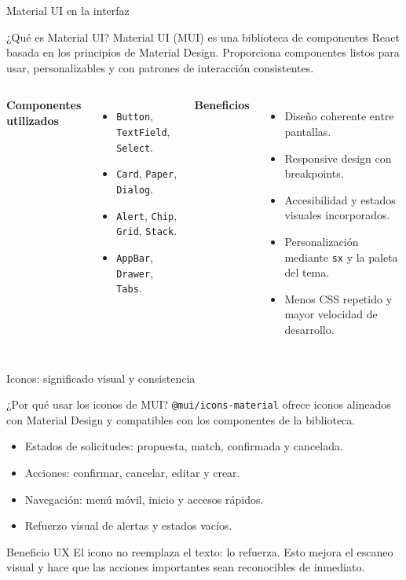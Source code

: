\documentclass[aspectratio=169,11pt]{beamer}
\begin{document}
\begin{frame}{Material UI en la interfaz}
  \begin{block}{¿Qué es Material UI?}
    Material UI (MUI) es una biblioteca de componentes React basada en los
    principios de Material Design. Proporciona componentes listos para usar,
    personalizables y con patrones de interacción consistentes.
  \end{block}
  \begin{columns}[T]
      \textbf{Componentes utilizados}
      \begin{itemize}
        \item \texttt{Button}, \texttt{TextField}, \texttt{Select}.
        \item \texttt{Card}, \texttt{Paper}, \texttt{Dialog}.
        \item \texttt{Alert}, \texttt{Chip}, \texttt{Grid}, \texttt{Stack}.
        \item \texttt{AppBar}, \texttt{Drawer}, \texttt{Tabs}.
      \end{itemize}
      \textbf{Beneficios}
      \begin{itemize}
        \item Diseño coherente entre pantallas.
        \item Responsive design con breakpoints.
        \item Accesibilidad y estados visuales incorporados.
        \item Personalización mediante \texttt{sx} y la paleta del tema.
        \item Menos CSS repetido y mayor velocidad de desarrollo.
      \end{itemize}
  \end{columns}
\end{frame}

\begin{frame}{Iconos: significado visual y consistencia}
  \begin{block}{¿Por qué usar los iconos de MUI?}
    \texttt{@mui/icons-material} ofrece iconos alineados con Material Design y
    compatibles con los componentes de la biblioteca.
  \end{block}
  \begin{itemize}
    \item Estados de solicitudes: propuesta, match, confirmada y cancelada.
    \item Acciones: confirmar, cancelar, editar y crear.
    \item Navegación: menú móvil, inicio y accesos rápidos.
    \item Refuerzo visual de alertas y estados vacíos.
  \end{itemize}
  \vspace{0.2cm}
  \begin{exampleblock}{Beneficio UX}
    El icono no reemplaza el texto: lo refuerza. Esto mejora el escaneo visual y
    hace que las acciones importantes sean reconocibles de inmediato.
  \end{exampleblock}
\end{frame}
\end{document}
